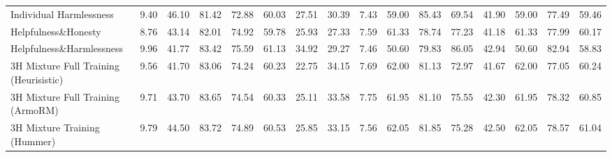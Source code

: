 \begin{table*}
{\begin{tabular}{lcccccccc|c|cc|cccc}
      Individual Harmlessness                & 9.40                                      & 46.10            & 81.42                                      & 72.88                                  & 60.03                                 & 27.51                                   & 30.39                         & 7.43     & 59.00           & 85.43           & 69.54       & 41.90 & 59.00 & 77.49 & 59.46             \\
      Helpfulness\&Honesty                   & 8.76                                      & 43.14            & 82.01                                      & 74.92                                  & 59.78                                 & 25.93                                   & 27.33                         & 7.59     & 61.33           & 78.74           & 77.23       & 41.18 & 61.33 & 77.99 & 60.17             \\
      Helpfulness\&Harmlessness              & 9.96                                      & 41.77            & 83.42                                      & 75.59                                  & 61.13                                 & 34.92                                   & 29.27                         & 7.46     & 50.60           & 79.83           & 86.05       & 42.94 & 50.60 & 82.94 & 58.83             \\ \midrule
      3H Mixture Full Training (Heurisistic) & 9.56                                      & 41.70            & 83.06                                      & 74.24                                  & 60.23                                 & 22.75                                   & 34.15                         & 7.69     & 62.00           & 81.13           & 72.97       & 41.67 & 62.00 & 77.05 & 60.24             \\
      3H Mixture Full Training (ArmoRM)      & 9.71                                      & 43.70            & 83.65                                      & 74.54                                  & 60.33                                 & 25.11                                   & 33.58                         & 7.75     & 61.95           & 81.10           & 75.55       & 42.30 & 61.95 & 78.32 & 60.85             \\
      3H Mixture Training (Hummer)           & 9.79                                      & 44.50            & 83.72                                      & 74.89                                  & 60.53                                 & 25.85                                   & 33.15                         & 7.56     & 62.05           & 81.85           & 75.28       & 42.50 & 62.05 & 78.57 & 61.04             \\ \midrule

\end{tabular}}
\end{table*}
